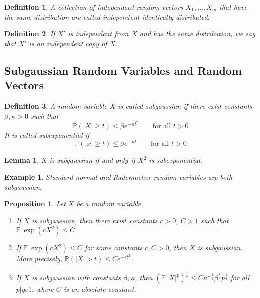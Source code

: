 \documentclass[10pt,a4paper]{article}
\theoremstyle{thmstyle}
\newtheorem{definition}{Definition}
\newtheorem{lemma}{Lemma}
\newtheorem{example}{Example}
\newtheorem{proposition}{Proposition}
\newcommand{\E}{\mathbb{E}~}
\renewcommand{\Pr}[1]{\mathbb{P}\left( #1 \right)}
\begin{document}
\begin{definition}
  A collection of independent random vectors $X_{1}, \dots, X_{m}$ that have the same distribution are called independent identically distributed.
\end{definition}

\begin{definition}
  If $X'$ is independent from $X$ and has the same distribution, we say that $X'$ is an \emph{independent copy} of $X$.
\end{definition}

\subsection{Subgaussian Random Variables and Random Vectors}

\begin{definition}
  A random variable $X$ is called \emph{subgaussian} if there exist constants $\beta, \kappa > 0$ such that
  \begin{equation*}
    \Pr{|X| \ge t} \le \beta e^{-\kappa t^{2}} \qquad \text{for all $t > 0$}
  \end{equation*}
  It is called \emph{subexponential} if
  \begin{equation*}
    \Pr{|x| \ge t} \le \beta e^{-\kappa t} \qquad \text{for all $t > 0$}
  \end{equation*}
\end{definition}

\begin{lemma}
  $X$ is subgaussian if and only if $X^{2}$ is subexponential.
\end{lemma}

\begin{example}
  Standard normal and Rademacher random variables are both subgaussian.
\end{example}

\begin{proposition}
  Let $X$ be a random variable.
  \begin{enumerate}
  \item If $X$ is subgaussian, then there exist constants $c > 0$, $C > 1$ such that $\E \exp(c X^{2}) \le C$
  \item If $\E \exp(c X^{2}) \le C$ for some constants $c, C > 0$, then $X$ is subgaussian.
    More precisely, $\Pr{|X| > t} \le C e^{-c t^{2}}$.
  \item If $X$ is subgaussian with constants $\beta, \kappa$, then $\left( \E |X|^{p} \right)^{\frac{1}{p}} \le \tilde{C} \kappa^{-\frac{1}{2}} \beta^{\frac{1}{p}} p^{\frac{1}{2}}$ for all $p |ge 1$, where $\tilde{C}$ is an absolute constant.
  \end{enumerate}
\end{proposition}
\end{document}
